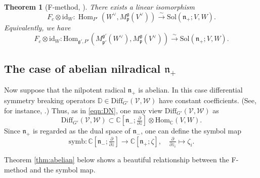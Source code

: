 \documentclass[reqno,11pt]{amsart}
\newtheorem{thm}[equation]{Theorem}
\theoremstyle{remark}
\theoremstyle{definition}
\numberwithin{equation}{section}
\newcommand{\fg}{{\mathfrak g}}
\newcommand{\fn}{{\mathfrak n}}
\newcommand{\fp}{{\mathfrak p}}
\newcommand{\C}{\mathbb{C}}
\newcommand{\Cal}{\mathcal}
\newcommand{\To}{\longrightarrow}
\newcommand{\Diff}{\mathrm{Diff}}
\newcommand{\Mp}{M^{\fg}_{\fp}}
\newcommand{\Mpp}{M^{\fg'}_{\fp'}}
\newcommand{\bD}{\mathbb{D}}
\begin{document}
\begin{thm}
[F-method, {\cite[Thm.\ 4.1]{KP1}}]
\label{thm:Fmethod}
There exists a linear isomorphism
\begin{equation*}
F_c \otimes \mathrm{id}_{W}\colon 
\operatorname{Hom}_{P'}(W^\vee,
\Mp(V^\vee))
\stackrel{\sim}{\To}
\mathrm{Sol}(\mathfrak n_+;V,W).
\end{equation*}
Equivalently, we have
\begin{equation*}
F_c \otimes \mathrm{id}_{W}\colon 
\mathrm{Hom}_{\mathfrak g',P'}(\Mpp(W^\vee),\Mp(V^\vee))\stackrel{\sim}{\To}
\mathrm{Sol}(\mathfrak n_+;V,W).
\end{equation*}
\end{thm}

\subsection{The case of abelian nilradical $\fn_+$}
\label{sec:abelian}

Now suppose that the nilpotent radical $\fn_+$ is abelian.
In this case differential symmetry breaking operators
$\bD \in \Diff_{G'}(\Cal{V},\Cal{W})$ have constant coefficients.
(See, for instance, \cite[Sect.\ 2]{KuOr24}.)
Thus, as in \eqref{eqn:DN}, one may view $\Diff_{G'}(\Cal{V},\Cal{W})$ as
\begin{equation*}
\Diff_{G'}(\Cal{V},\Cal{W}) \subset \C[\fn_-;\tfrac{\partial}{\partial z}]
 \otimes \mathrm{Hom}_{\C}(V,W).
\end{equation*}
Since $\fn_+$ is regarded as the dual space of $\fn_-$, 
one can define the symbol map
\begin{equation*}
\mathrm{symb}\colon
\C[\fn_-;\tfrac{\partial}{\partial z}]
\To\C[\fn_+;\zeta],
\quad 
\tfrac{\partial}{\partial z_i} \mapsto \zeta_i.
\end{equation*}
\vskip 0.1in

Theorem \ref{thm:abelian} below shows a beautiful relationship 
between the F-method and the symbol map.
\end{document}
